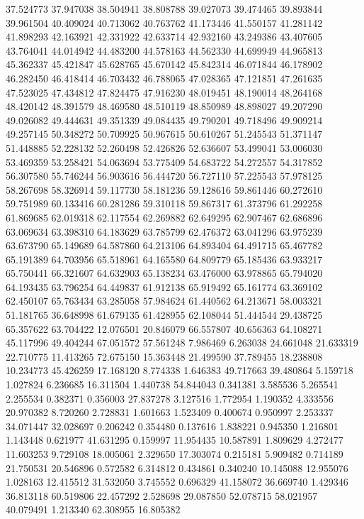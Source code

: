 37.524773
37.947038
38.504941
38.808788
39.027073
39.474465
39.893844
39.961504
40.409024
40.713062
40.763762
41.173446
41.550157
41.281142
41.898293
42.163921
42.331922
42.633714
42.932160
43.249386
43.407605
43.764041
44.014942
44.483200
44.578163
44.562330
44.699949
44.965813
45.362337
45.421847
45.628765
45.670142
45.842314
46.071844
46.178902
46.282450
46.418414
46.703432
46.788065
47.028365
47.121851
47.261635
47.523025
47.434812
47.824475
47.916230
48.019451
48.190014
48.264168
48.420142
48.391579
48.469580
48.510119
48.850989
48.898027
49.207290
49.026082
49.444631
49.351339
49.084435
49.790201
49.718496
49.909214
49.257145
50.348272
50.709925
50.967615
50.610267
51.245543
51.371147
51.448885
52.228132
52.260498
52.426826
52.636607
53.499041
53.006030
53.469359
53.258421
54.063694
53.775409
54.683722
54.272557
54.317852
56.307580
55.746244
56.903616
56.444720
56.727110
57.225543
57.978125
58.267698
58.326914
59.117730
58.181236
59.128616
59.861446
60.272610
59.751989
60.133416
60.281286
59.310118
59.867317
61.373796
61.292258
61.869685
62.019318
62.117554
62.269882
62.649295
62.907467
62.686896
63.069634
63.398310
64.183629
63.785799
62.476372
63.041296
63.975239
63.673790
65.149689
64.587860
64.213106
64.893404
64.491715
65.467782
65.191389
64.703956
65.518961
64.165580
64.809779
65.185436
63.933217
65.750441
66.321607
64.632903
65.138234
63.476000
63.978865
65.794020
64.193435
63.796254
64.449837
61.912138
65.919492
65.161774
63.369102
62.450107
65.763434
63.285058
57.984624
61.440562
64.213671
58.003321
51.181765
36.648998
61.679135
61.428955
62.108044
51.444544
29.438725
65.357622
63.704422
12.076501
20.846079
66.557807
40.656363
64.108271
45.117996
49.404244
67.051572
57.561248
7.986469
6.263038
24.661048
21.633319
22.710775
11.413265
72.675150
15.363448
21.499590
37.789455
18.238808
10.234773
45.426259
17.168120
8.774338
1.646383
49.717663
39.480864
5.159718
1.027824
6.236685
16.311504
1.440738
54.844043
0.341381
3.585536
5.265541
2.255534
0.382371
0.356003
27.837278
3.127516
1.772954
1.190352
4.333556
20.970382
8.720260
2.728831
1.601663
1.523409
0.400674
0.950997
2.253337
34.071447
32.028697
0.206242
0.354480
0.137616
1.838221
0.945350
1.216801
1.143448
0.621977
41.631295
0.159997
11.954435
10.587891
1.809629
4.272477
11.603253
9.729108
18.005061
2.329650
17.303074
0.215181
5.909482
0.714189
21.750531
20.546896
0.572582
6.314812
0.434861
0.340240
10.145088
12.955076
1.028163
12.415512
31.532050
3.745552
0.696329
41.158072
36.669740
1.429346
36.813118
60.519806
22.457292
2.528698
29.087850
52.078715
58.021957
40.079491
1.213340
62.308955
16.805382
